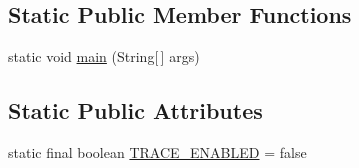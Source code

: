 \subsection*{Static Public Member Functions}
\begin{DoxyCompactItemize}
\item 
static void \mbox{\hyperlink{classorg_1_1newdawn_1_1slick_1_1tools_1_1hiero_1_1truetype_1_1_t_t_f_file_af5014f2d505b558d0dc0ffba5f9ce403}{main}} (String\mbox{[}$\,$\mbox{]} args)
\end{DoxyCompactItemize}
\subsection*{Static Public Attributes}
\begin{DoxyCompactItemize}
\item 
static final boolean \mbox{\hyperlink{classorg_1_1newdawn_1_1slick_1_1tools_1_1hiero_1_1truetype_1_1_t_t_f_file_af602c3addde80316c5c7d6bf6c725746}{T\+R\+A\+C\+E\+\_\+\+E\+N\+A\+B\+L\+ED}} = false
\end{DoxyCompactItemize}
